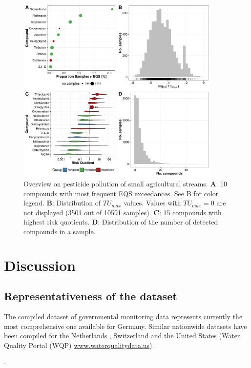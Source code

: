 \documentclass[journal=esthag,manuscript=article]{achemso}
\begin{document}
\begin{figure}[h]
  \includegraphics[width=0.9\textwidth]{figure5.pdf}
  \caption{Overview on pesticide pollution of small agricultural streams. 
      \textbf{A}: 10 compounds with most frequent EQS exceedances. See B for color legend.
      \textbf{B}: Distribution of $TU_{max}$ values. Values with $TU_{max} = 0$ are not displayed (3501 out of 10591 samples).
      \textbf{C}: 15 compounds with highest risk quotients.
      \textbf{D}: Distribution of the number of detected compounds in a sample.
  }
  \label{fig:fig5}
\end{figure}



\section{Discussion}

\subsection{Representativeness of the dataset}
The compiled dataset of governmental monitoring data represents currently the most comprehensive one available for Germany.
Similar nationwide datasets have been compiled for the Netherlands \citep{vijver_spatial_2008}, Switzerland  and the United States (Water Quality Portal (WQP) \url{www.waterqualitydata.us}).

.
\end{document}
